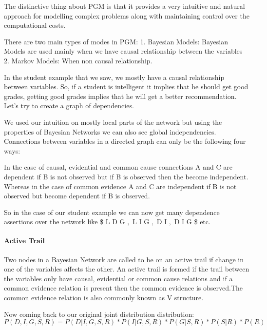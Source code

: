 \documentclass{article}
\begin{document}
The distinctive thing about PGM is that it provides a very intuitive and
natural approach for modelling complex problems along with maintaining
control over the computational costs.

    There are two main types of modes in PGM: 1. Bayesian Models: Bayesian
Models are used mainly when we have causal relationship between the
variables 2. Markov Models: When non causal relationship.

    In the student example that we saw, we mostly have a causal relationship
between variables. So, if a student is intelligent it implies that he
should get good grades, getting good grades implies that he will get a
better recommendation. Let's try to create a graph of dependencies.

    

    We used our intuition on mostly local parts of the network but using the
properties of Bayesian Networks we can also see global independencies.
Connections between variables in a directed graph can only be the
following four ways:

    

    In the case of causal, evidential and common cause connections A and C
are dependent if B is not observed but if B is observed then the become
independent. Whereas in the case of common evidence A and C are
independent if B is not observed but become dependent if B is observed.

So in the case of our student example we can now get many dependence
assertions over the network like \$ L \perp D \textbar{} G $, $ L
\perp I \textbar{} G $, $ D \perp I $, $ D \not\perp I \textbar{} G \$
etc.

    \paragraph{Active Trail}\label{active-trail}

Two nodes in a Bayesian Network are called to be on an active trail if
change in one of the variables affects the other. An active trail is
formed if the trail between the variables only have causal, evidential
or common cause relations and if a common evidence relation is present
then the common evidence is observed.The common evidence relation is
also commonly known as V structure.

    Now coming back to our original joint distribution distribution:
\[ P(D, I, G, S, R) = P(D | I, G, S, R) * P(I | G, S, R) * P(G | S, R) * P(S | R) * P(R) \]
\end{document}
